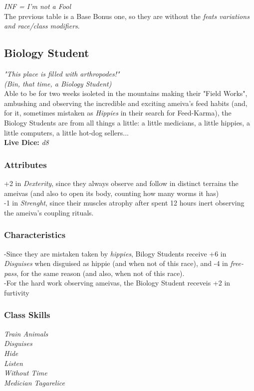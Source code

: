 \documentclass[ letterpaper,12pt]{article}
\begin{document}
{\it *INF = I'm not a Fool}\\

The previous table is a Base Bonus one, so they are without the {\it feats variations and race/class modifiers}.\\

\subsection{Biology Student}
{\it "This place is filled with arthropodes!"\\(Bin, that time, a Biology Student)}\\

Able to be for two weeks isoleted in the mountains making their "Field Works", ambushing and observing the incredible and exciting ameiva's feed habits (and, for it, sometimes mistaken as {\it Hippies} in their search for Feed-Karma), the Biology Students are from all things a little: a little medicians, a little hippies, a little computers, a little hot-dog sellers...\\

{\bf Live Dice:} {\it d8}

\subsubsection{Attributes}
+2 in {\it Dexterity}, since they always observe and follow in distinct terrains the ameivas (and also to open its body, counting how many worms it has)\\
-1 in {\it Strenght}, since their muscles atrophy after spent 12 hours inert observing the ameiva's coupling rituals.\\

\subsubsection{Characteristics}
-Since they are mistaken taken by {\it hippies}, Bilogy Students receive +6 in {\it Disguises} when disguised as hippie (and when not of this race), and -4 in {\it free-pass}, for the same reason (and also, when not of this race).\\
-For the hard work observing ameivas, the Biology Student receveis +2 in {furtivity}\\

\subsubsection{Class Skills}
{\it 
Train Animals\\
Disguises\\
Hide\\
Listen\\
Without Time\\
Medician Tagarelice
}\\
\end{document}
